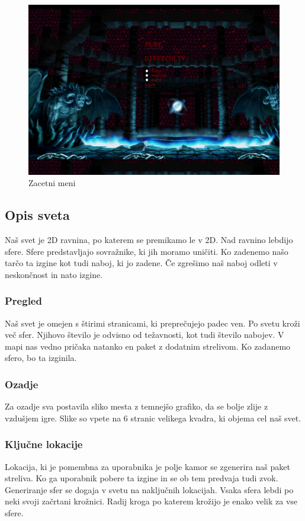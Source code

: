 \documentclass[a4paper]{article}
\begin{document}
\begin{figure}[!htb]
    \begin{center}
        \includegraphics[width=\columnwidth]{slika2.png}
        \caption{Zacetni meni} \label{fig:slika2}
    \end{center}
\end{figure}

\subsection{Opis sveta}
Naš svet je 2D ravnina, po katerem se premikamo le v 2D. Nad ravnino lebdijo sfere. Sfere predstavljajo sovražnike, ki jih moramo uničiti.
Ko zadenemo našo tarčo ta izgine kot tudi naboj, ki jo zadene. Če zgrešimo naš naboj odleti v neskončnost in nato izgine.

\subsubsection{Pregled}
Naš svet je omejen s štirimi stranicami, ki preprečujejo padec ven. Po svetu kroži več sfer. Njihovo število je odvisno od težavnosti, kot tudi
število nabojev. V mapi nas vedno pričaka natanko en paket z dodatnim strelivom. Ko zadanemo sfero, bo ta izginila.

\subsubsection{Ozadje}
Za ozadje sva postavila sliko mesta z temnejšo grafiko, da se bolje zlije z vzdušjem igre. Slike so vpete na 6 stranic velikega kvadra, ki objema cel naš svet.

\subsubsection{Ključne lokacije}
Lokacija, ki je pomembna za uporabnika je polje kamor se zgenerira naš paket streliva. Ko ga uporabnik pobere ta izgine in se ob tem predvaja tudi zvok. 
Generiranje sfer se dogaja v svetu na naključnih lokacijah. Vsaka sfera lebdi po neki svoji začrtani krožnici. 
Radij kroga po katerem krožijo je enako velik za vse sfere.
\end{document}
